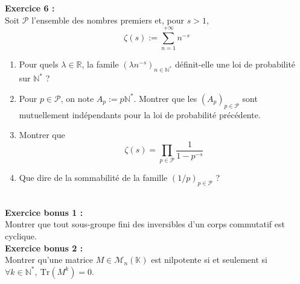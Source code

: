 \documentclass[11pt,a4paper]{article}
\begin{document}
\textbf{Exercice 6 :} \\
Soit $\mathcal{P}$ l'ensemble des nombres premiers et, pour $s>1$, \[\zeta(s) := \sum_{n=1}^{+\infty} n^{-s}\]
\begin{enumerate}
\item Pour quels $\lambda \in \mathbb{R}$, la famile $(\lambda n^{-s})_{n \in \mathbb{N}^*}$ définit-elle une loi de probabilité sur $\mathbb{N^*}$ ?
\item Pour $p \in \mathcal{P}$, on note $A_p := p\mathbb{N}^*$. Montrer que les $\displaystyle (A_p)_{p \in \mathcal{P}}$ sont mutuellement indépendants pour la loi de probabilité précédente.
\item Montrer que \[\zeta(s) = \prod_{p\in \mathcal{P}}\frac{1}{1-p^{-s}}\]
\item Que dire de la sommabilité de la famille $\displaystyle (1/p)_{p \in \mathcal{P}}$ ?
\end{enumerate}
~ \\
\textbf{Exercice bonus 1 :} \\
Montrer que tout sous-groupe fini des inversibles d'un corps commutatif est cyclique. \\


\textbf{Exercice bonus 2 :} \\
Montrer qu'une matrice $M \in \mathcal{M}_n(\mathbb{K})$ est nilpotente si et seulement si $ \forall k \in \mathbb{N}^*, \ \text{Tr}(M^k)=0$.
\end{document}
